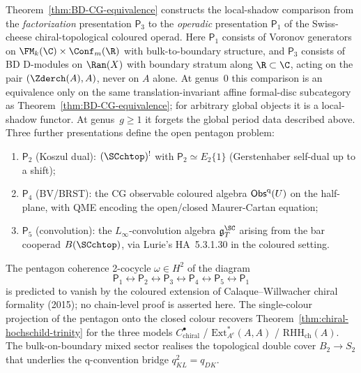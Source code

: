\begin{remark}
\label{rem:sc-chtop-pentagon}
Theorem~\ref{thm:BD-CG-equivalence} constructs the local-shadow
comparison from the \emph{factorization} presentation
$\mathsf P_3$ to the \emph{operadic} presentation $\mathsf P_1$ of
the Swiss-cheese chiral-topological coloured operad. Here
$\mathsf P_1$ consists of Voronov generators on
$\FM_k(\C) \times \Conf_m(\R)$ with bulk-to-boundary structure, and
$\mathsf P_3$ consists of BD D-modules on
$\Ran(X)$ with boundary stratum along $\R \subset \C$, acting on the
pair $(\Zderch(A), A)$, never on $A$ alone. At genus~$0$ this
comparison is an equivalence only on the same translation-invariant
affine formal-disc subcategory as Theorem~\ref{thm:BD-CG-equivalence};
for arbitrary global objects it is a local-shadow functor. At
genus~$g\ge 1$ it forgets the global period data described above.
Three further presentations define the open pentagon problem:
\begin{enumerate}[label=(\roman*)]
\item $\mathsf P_2$ (Koszul dual): $(\SCchtop)^!$ with
$\mathsf P_2 \simeq E_2\{1\}$ (Gerstenhaber self-dual up to a shift);
\item $\mathsf P_4$ (BV/BRST): the CG observable coloured algebra
$\mathsf{Obs}^{\mathrm{q}}(U)$ on the half-plane, with QME encoding the
open/closed Maurer-Cartan equation;
\item $\mathsf P_5$ (convolution): the $L_\infty$-convolution
algebra $\mathfrak g^{\SC}_T$ arising from the bar cooperad
$B(\SCchtop)$, via Lurie's HA~5.3.1.30 in the coloured setting.
\end{enumerate}
The pentagon coherence 2-cocycle $\omega \in H^2$ of the diagram
\[
\mathsf P_1 \longleftrightarrow \mathsf P_2 \longleftrightarrow
\mathsf P_3 \longleftrightarrow \mathsf P_4 \longleftrightarrow
\mathsf P_5 \longleftrightarrow \mathsf P_1
\]
is predicted to vanish by the coloured extension of
Calaque--Willwacher chiral formality (2015); no chain-level proof is
asserted here. The single-colour
projection of the pentagon onto the closed colour recovers
Theorem~\ref{thm:chiral-hochschild-trinity} for the three models
$C^\bullet_{\mathrm{chiral}}$ / $\mathrm{Ext}^\ast_{A^e}(A,A)$ /
$\mathrm{RHH}_{\mathrm{ch}}(A)$. The bulk-on-boundary
mixed sector realises the topological double cover $B_2 \to S_2$ that
underlies the q-convention bridge $q_{KL}^2 = q_{DK}$.
\end{remark}

